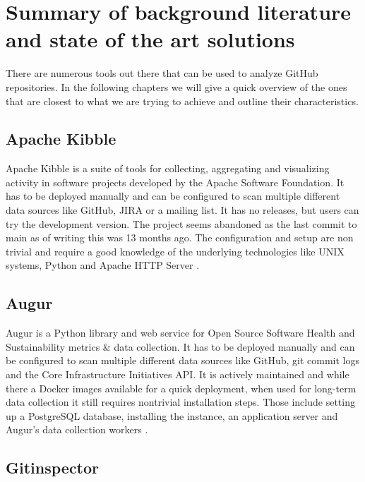 \documentclass[authoryear,preprint,review,12pt]{elsarticle}
\begin{document}
\section{Summary of background literature and state of the art solutions}
\label{sec:summary}

There are numerous tools out there that can be used to analyze GitHub repositories. In the
following chapters we will give a quick overview of the ones that are closest to what we are trying
to achieve and outline their characteristics.

\subsection{Apache Kibble}
\label{sec:summary:kibble}

Apache Kibble is a suite of tools for collecting, aggregating and visualizing activity in software
projects developed by the Apache Software Foundation. It has to be deployed manually and can be
configured to scan multiple different data sources like GitHub, JIRA or a mailing list. It has no
releases, but users can try the development version. The project seems abandoned as the last commit
to main as of writing this was 13 months ago. The configuration and setup are non trivial and
require a good knowledge of the underlying technologies like UNIX systems, Python and Apache HTTP
Server \citep{ApacheKibble2022}.

\subsection{Augur}
\label{sec:summary:augur}

Augur is a Python library and web service for Open Source Software Health and Sustainability
metrics \& data collection. It has to be deployed manually and can be configured to scan multiple
different data sources like GitHub, git commit logs and the Core Infrastructure Initiatives API. It
is actively maintained and while there a Docker images available for a quick deployment, when used
for long-term data collection it still requires nontrivial installation steps. Those include
setting up a PostgreSQL database, installing the instance, an application server and Augur's data
collection workers \citep{Augur2022}.

\subsection{Gitinspector}
\label{sec:summary:gitinspector}
\end{document}
